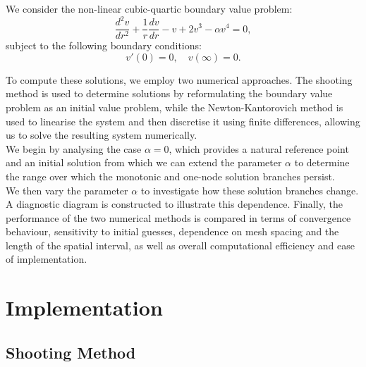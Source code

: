 \documentclass[12pt]{article}
\begin{document}
We consider the non-linear cubic-quartic boundary value problem:
\begin{equation}
\frac{d^2 v}{dr^2} + \frac{1}{r} \frac{dv}{dr} - v + 2v^3 - \alpha v^4 = 0,
\end{equation}
subject to the following boundary conditions: 
\begin{equation}
v'(0) = 0, \quad v(\infty) = 0.
\end{equation}


To compute these solutions, we employ two numerical approaches. The shooting method is used to determine solutions by reformulating the boundary value problem as an initial value problem, while the Newton-Kantorovich method is used to linearise the system and then discretise it using finite differences, allowing us to solve the resulting system numerically.\\

We begin by analysing the case $\alpha = 0$, which provides a natural reference point and an initial solution from which we can extend the parameter $\alpha$ to determine the range over which the monotonic and one-node solution branches persist.\\

We then vary the parameter $\alpha$ to investigate how these solution branches change. A diagnostic diagram is constructed to illustrate this dependence. Finally, the performance of the two numerical methods is compared in terms of convergence behaviour, sensitivity to initial guesses, dependence on mesh spacing and the length of the spatial interval, as well as overall computational efficiency and ease of implementation.\\

\section*{Implementation}

\subsection*{Shooting Method}
\end{document}

